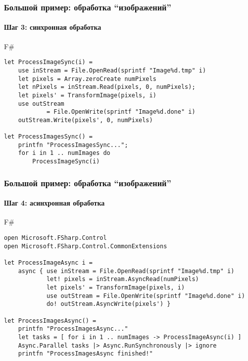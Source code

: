 \documentclass[xetex,mathserif,serif]{beamer}
\begin{document}
	\begin{frame}[fragile]
		\frametitle{Большой пример: обработка ``изображений''}
		\framesubtitle{Шаг 3: синхронная обработка}
		\begin{exampleblock}{F\#}
			\begin{verbatim}
let ProcessImageSync(i) =
    use inStream = File.OpenRead(sprintf "Image%d.tmp" i)
    let pixels = Array.zeroCreate numPixels
    let nPixels = inStream.Read(pixels, 0, numPixels);
    let pixels' = TransformImage(pixels, i)
    use outStream 
            = File.OpenWrite(sprintf "Image%d.done" i)
    outStream.Write(pixels', 0, numPixels)

let ProcessImagesSync() =
    printfn "ProcessImagesSync...";
    for i in 1 .. numImages do
        ProcessImageSync(i)
			\end{verbatim}
		\end{exampleblock}
\end{frame}

	\begin{frame}[fragile]
		\frametitle{Большой пример: обработка ``изображений''}
		\framesubtitle{Шаг 4: асинхронная обработка}
		\begin{footnotesize}
			\begin{exampleblock}{F\#}
				\begin{verbatim}
open Microsoft.FSharp.Control
open Microsoft.FSharp.Control.CommonExtensions

let ProcessImageAsync i =
    async { use inStream = File.OpenRead(sprintf "Image%d.tmp" i)
            let! pixels = inStream.AsyncRead(numPixels)
            let pixels' = TransformImage(pixels, i)
            use outStream = File.OpenWrite(sprintf "Image%d.done" i)
            do! outStream.AsyncWrite(pixels') }

let ProcessImagesAsync() =
    printfn "ProcessImagesAsync..."
    let tasks = [ for i in 1 .. numImages -> ProcessImageAsync(i) ]
    Async.Parallel tasks |> Async.RunSynchronously |> ignore
    printfn "ProcessImagesAsync finished!"
				\end{verbatim}
			\end{exampleblock}
		\end{footnotesize}
\end{frame}
\end{document}
